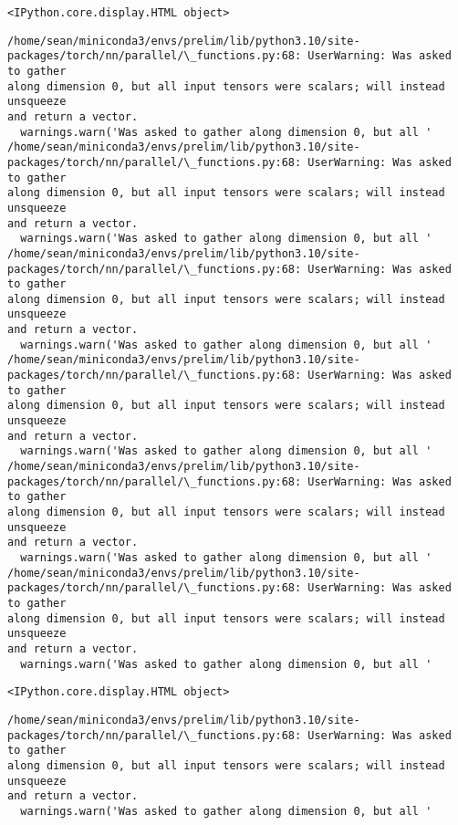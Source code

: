 \documentclass[11pt]{article}
\begin{document}
    
    \begin{Verbatim}[commandchars=\\\{\}]
<IPython.core.display.HTML object>
    \end{Verbatim}

    
    \begin{Verbatim}[commandchars=\\\{\}]
/home/sean/miniconda3/envs/prelim/lib/python3.10/site-
packages/torch/nn/parallel/\_functions.py:68: UserWarning: Was asked to gather
along dimension 0, but all input tensors were scalars; will instead unsqueeze
and return a vector.
  warnings.warn('Was asked to gather along dimension 0, but all '
/home/sean/miniconda3/envs/prelim/lib/python3.10/site-
packages/torch/nn/parallel/\_functions.py:68: UserWarning: Was asked to gather
along dimension 0, but all input tensors were scalars; will instead unsqueeze
and return a vector.
  warnings.warn('Was asked to gather along dimension 0, but all '
/home/sean/miniconda3/envs/prelim/lib/python3.10/site-
packages/torch/nn/parallel/\_functions.py:68: UserWarning: Was asked to gather
along dimension 0, but all input tensors were scalars; will instead unsqueeze
and return a vector.
  warnings.warn('Was asked to gather along dimension 0, but all '
/home/sean/miniconda3/envs/prelim/lib/python3.10/site-
packages/torch/nn/parallel/\_functions.py:68: UserWarning: Was asked to gather
along dimension 0, but all input tensors were scalars; will instead unsqueeze
and return a vector.
  warnings.warn('Was asked to gather along dimension 0, but all '
/home/sean/miniconda3/envs/prelim/lib/python3.10/site-
packages/torch/nn/parallel/\_functions.py:68: UserWarning: Was asked to gather
along dimension 0, but all input tensors were scalars; will instead unsqueeze
and return a vector.
  warnings.warn('Was asked to gather along dimension 0, but all '
/home/sean/miniconda3/envs/prelim/lib/python3.10/site-
packages/torch/nn/parallel/\_functions.py:68: UserWarning: Was asked to gather
along dimension 0, but all input tensors were scalars; will instead unsqueeze
and return a vector.
  warnings.warn('Was asked to gather along dimension 0, but all '
    \end{Verbatim}

    
    \begin{Verbatim}[commandchars=\\\{\}]
<IPython.core.display.HTML object>
    \end{Verbatim}

    
    \begin{Verbatim}[commandchars=\\\{\}]
/home/sean/miniconda3/envs/prelim/lib/python3.10/site-
packages/torch/nn/parallel/\_functions.py:68: UserWarning: Was asked to gather
along dimension 0, but all input tensors were scalars; will instead unsqueeze
and return a vector.
  warnings.warn('Was asked to gather along dimension 0, but all '
    \end{Verbatim}
\end{document}
